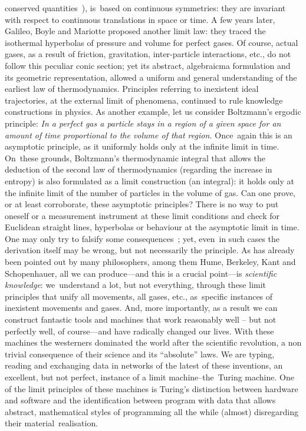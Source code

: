 \documentclass[12pt]{article}
\begin{document}
conserved quantities~\cite{noether1918invariante}), is~based on continuous symmetries: they are invariant with respect
to continuous translations in space or time.
A few years later, Galileo, Boyle and Mariotte proposed another limit law: they traced the isothermal hyperbolas of
pressure and volume for perfect gases.
Of course, actual gases, as a result of friction, gravitation, inter-particle interactions, etc., do not follow this peculiar
conic section;
yet its abstract, algebraicma formulation and its geometric representation, allowed a uniform and general understanding of
the earliest law of thermodynamics.
Principles referring to inexistent ideal trajectories, at the external limit of phenomena, continued to rule knowledge
constructions in physics.
As another example, let us consider Boltzmann's ergodic principle:
{\em In a perfect gas a particle stays in a region of a given space for an amount of time proportional to the volume of
that region.}
Once~again this is an asymptotic principle, as it uniformly holds only at the infinite limit in time.
On~these grounds, Boltzmann's thermodynamic integral that allows the deduction of the second law of thermodynamics
(regarding the increase in entropy) is also formulated as a limit construction (an integral):
it holds only at the infinite limit of the number of particles in the volume of gas.
Can one prove, or at least corroborate,
these asymptotic principles?
There is no way to put oneself or a measurement instrument at these limit conditions and check for Euclidean straight
lines, hyperbolas or behaviour at the asymptotic limit in time.
One may only try to falsify some consequences~\cite{popper-en};
yet, even~in such cases the derivation itself may be wrong, but  not necessarily the principle.
As has already been pointed out by many philosophers, among them Hume, Berkeley, Kant and Schopenhauer,
all we can produce---and this is a crucial point---is {\em scientific knowledge}: we~understand a lot, but not everything,
through these limit principles that unify all movements, all gases, etc., as~specific instances of inexistent movements and
gases.
And, more importantly, as a result we can construct fantastic tools and machines  that work reasonably well -- but not perfectly well, of course---and have radically changed our lives.
With these machines the westerners dominated the world after the scientific revolution, a non trivial consequence
of their science and its ``absolute'' laws.
We are typing, reading and exchanging data in networks of the latest of these inventions, an excellent, but not perfect,
instance of a limit machine--the~Turing machine.
One of the limit principles of these machines is  Turing's
distinction between hardware and software and the identification between program with data that allows abstract,
mathematical styles of programming all the while (almost) disregarding their material~realisation.
\end{document}
